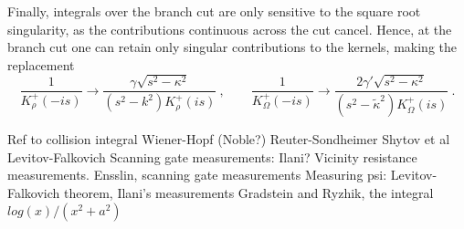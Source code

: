 \documentclass[preprint,aps,eqsecnum, prb]{revtex4-1}
\newcommand{\fplus}[1]{{#1}^{+}}
\begin{document}
Finally, integrals over the branch cut are only sensitive
to the square root singularity, as the contributions continuous
across the cut cancel.
Hence, at the branch cut one can retain only singular contributions
to the kernels, making the replacement
\begin{equation}
 \frac{1}{\fplus{K}_\rho (-is)} \to
  \frac{\gamma\sqrt{s^2 - \kappa^2}}{(s^2 - k^2) \fplus{K}_\rho(is)}
 \ , \qquad
 \frac{1}{\fplus{K}_\Omega(-is)} \to
 \frac{2 \gamma' \sqrt{s^2 - \kappa^2}}{(s^2 - {\tilde \kappa}^2)
 \fplus{K}_\Omega(is)}
 \ .
\end{equation}


\begin{thebibliography}{99}
 Ref to collision integral
 Wiener-Hopf (Noble?)
 Reuter-Sondheimer
 Shytov et al
 Levitov-Falkovich
 Scanning gate measurements: Ilani?
 Vicinity resistance measurements.
 Ensslin, scanning gate measurements
 Measuring psi: Levitov-Falkovich theorem,
  Ilani's measurements
 Gradstein and Ryzhik, the integral $log(x)/(x^2 + a^2)$
\end{thebibliography}
\end{document}
